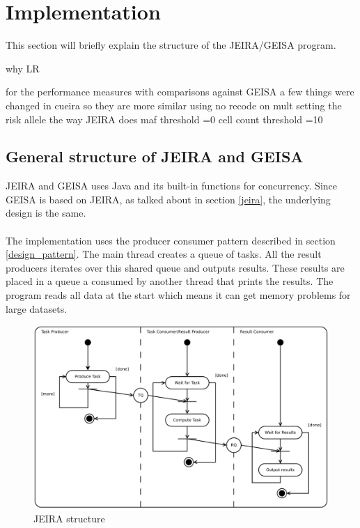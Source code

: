 \documentclass[10pt,a4paper]{report}
\begin{document}
\newpage
\section{Implementation}
\label{implementation}
This section will briefly explain the structure of the JEIRA/GEISA program.

why LR

for the performance measures with comparisons against GEISA a few things were changed in cueira so they are more similar
using no recode on mult
setting the risk allele the way JEIRA does
maf threshold =0
cell count threshold =10

\subsection{General structure of JEIRA and GEISA}
JEIRA and GEISA uses Java and its built-in functions for concurrency. Since GEISA is based on JEIRA, as talked about in section \ref{jeira}, the underlying design is the same.\\
\\
The implementation uses the producer consumer pattern described in section \ref{design_pattern}. The main thread creates a queue of tasks. All the result producers iterates over this shared queue and outputs results. These results are placed in a queue a consumed by another thread that prints the results. The program reads all data at the start which means it can get memory problems for large datasets.


\begin{figure}[h]
    \centering
    \includegraphics[width=12cm]{jeira_structure.png}
    \caption{JEIRA structure}
    \label{fig:jeira_structure}
\end{figure}
\end{document}
